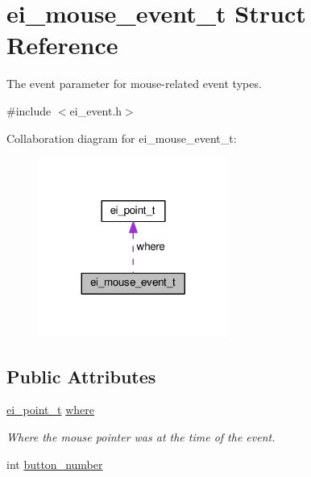\hypertarget{structei__mouse__event__t}{}\section{ei\+\_\+mouse\+\_\+event\+\_\+t Struct Reference}
\label{structei__mouse__event__t}


The event parameter for mouse-\/related event types.  




{\ttfamily \#include $<$ei\+\_\+event.\+h$>$}



Collaboration diagram for ei\+\_\+mouse\+\_\+event\+\_\+t\+:
\nopagebreak
\begin{figure}[H]
\begin{center}
\leavevmode
\includegraphics[width=176pt]{structei__mouse__event__t__coll__graph}
\end{center}
\end{figure}
\subsection*{Public Attributes}
\begin{DoxyCompactItemize}
\item 
\hyperlink{structei__point__t}{ei\+\_\+point\+\_\+t} \hyperlink{structei__mouse__event__t_ac50f216f7af2a99469bd39cebc309af5}{where}\hypertarget{structei__mouse__event__t_ac50f216f7af2a99469bd39cebc309af5}{}\label{structei__mouse__event__t_ac50f216f7af2a99469bd39cebc309af5}

\begin{DoxyCompactList}\small\item\em Where the mouse pointer was at the time of the event. \end{DoxyCompactList}\item 
int \hyperlink{structei__mouse__event__t_a3165d2e07c861aa9ccb114a10a6b0afb}{button\+\_\+number}
\end{DoxyCompactItemize}


